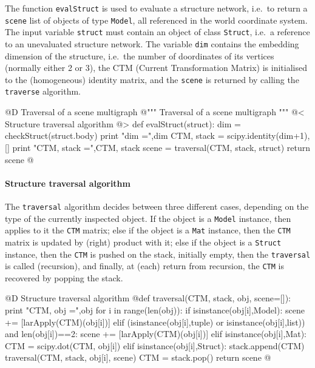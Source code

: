 \documentclass[11pt,oneside]{article}	%
\begin{document}
The function \texttt{evalStruct} is used to evaluate a structure network, i.e.~to return a \texttt{scene}
list of objects of type \texttt{Model}, all referenced in the world coordinate system. The input variable \texttt{struct} must contain an object of class \texttt{Struct}, i.e.~a reference to an unevaluated structure network. The variable \texttt{dim}  contains the embedding dimension of the structure, i.e.~the number of doordinates of its vertices (normally either 2 or 3), the CTM (Current Transformation Matrix) is initialised to the (homogeneous) identity matrix, and  the \texttt{scene} is returned by calling the \texttt{traverse} algorithm.

@D Traversal of a scene multigraph
@{""" Traversal of a scene multigraph """
@< Structure traversal algorithm @>
def evalStruct(struct):
	dim = checkStruct(struct.body)
	print "\n dim =",dim
	CTM, stack = scipy.identity(dim+1), []
	print "\n CTM, stack =",CTM, stack
	scene = traversal(CTM, stack, struct) 
	return scene
@}

\paragraph{Structure traversal algorithm}

The \texttt{traversal} algorithm decides between three different cases, depending on the type of the currently inspected object. If the object is a \texttt{Model} instance, then applies to it the \texttt{CTM} matrix; else if the object is a \texttt{Mat} instance, then the \texttt{CTM} matrix is updated by (right) product with it; else if the object is a \texttt{Struct} instance, then the \texttt{CTM} is pushed on the stack, initially empty, then the \texttt{traversal} is called (recursion), and finally, at (each) return from recursion, the \texttt{CTM} is recovered by popping the stack.

@D Structure traversal algorithm 
@{def traversal(CTM, stack, obj, scene=[]):
	print "\n CTM, obj =",obj
	for i in range(len(obj)):
		if isinstance(obj[i],Model): 
			scene += [larApply(CTM)(obj[i])]
		elif (isinstance(obj[i],tuple) or isinstance(obj[i],list)) and len(obj[i])==2:
			scene += [larApply(CTM)(obj[i])]
		elif isinstance(obj[i],Mat): 
			CTM = scipy.dot(CTM, obj[i])
		elif isinstance(obj[i],Struct):
			stack.append(CTM) 
			traversal(CTM, stack, obj[i], scene)
			CTM = stack.pop()
	return scene
@}
\end{document}
